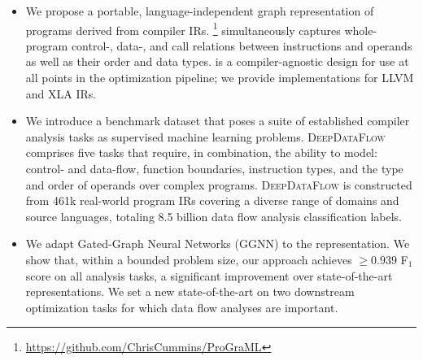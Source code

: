 \begin{itemize}
\item
We propose a portable, language-independent graph representation of programs
derived from compiler IRs.
\programl\footnote{\url{https://github.com/ChrisCummins/ProGraML}}
simultaneously captures whole-program control-, data-, and call relations
between instructions and operands as well as their order and data types.
\programl is a compiler-agnostic design for use at all points in the
optimization pipeline; we provide implementations for LLVM and XLA IRs.
\item
We introduce a benchmark dataset that poses a suite of established compiler
analysis tasks as supervised machine learning problems.
\textsc{DeepDataFlow}~\cite{chris_cummins_2020_4247595} comprises five tasks
that require, in combination, the ability to model: control- and data-flow,
function boundaries, instruction types, and the type and order of operands over
complex programs. \textsc{DeepDataFlow} is constructed from 461k real-world
program IRs covering a diverse range of domains and source languages, totaling
8.5 billion data flow analysis classification labels.
\item
We adapt Gated-Graph Neural Networks (GGNN) to the \programl representation. We
show that, within a bounded problem size, our approach achieves $\ge 0.939$
F$_1$ score on all analysis tasks, a significant improvement over
state-of-the-art representations. We set a new state-of-the-art on two
downstream optimization tasks for which data flow analyses are important.
\end{itemize}
